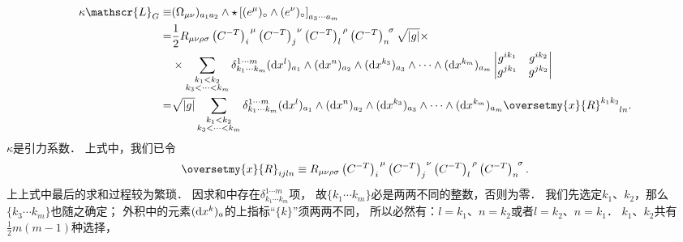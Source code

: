 \begin{align*}
	\kappa\mathscr{L}_{G} \equiv& (\Omega_{\mu\nu} )_{a_1 a_2}\wedge 
	\star \left[ (e^\mu)_{\circ} \wedge (e^\nu)_{\circ}\right]_{a_3 \cdots a_m} \\
	=& \frac{1}{2} R_{\mu\nu\rho\sigma}
	\left(C^{-T}\right)^{\hphantom{a}\mu}_{i} \left(C^{-T}\right)^{\hphantom{a}\nu}_{j} 
	\left(C^{-T}\right)^{\hphantom{a}\rho}_{l} \left(C^{-T}\right)^{\hphantom{a}\sigma}_{n} \sqrt{|g|} \times \\
	&\times \sum_{\substack {k_1<k_2 \\ k_{3}<\cdots<k_m}}
	\delta_{k_1 \cdots k_m}^{1 \cdots m}
	({\rm d}x^{l})_{a_1} \wedge ({\rm d}x^{n})_{a_2} \wedge 
	({\rm d}x^{k_{3}})_{a_{3}} \wedge \cdots \wedge ({\rm d}x^{k_m})_{a_m}
	\begin{vmatrix}
		g^{i k_1} & g^{i k_2}  \\
		g^{j k_1} & g^{j k_2}  \\
	\end{vmatrix} 	 \\
	=& \sqrt{|g|} 
	\sum_{\substack {k_1<k_2 \\ k_{3}<\cdots<k_m}}
	\delta_{k_1 \cdots k_m}^{1 \cdots m}
	({\rm d}x^{l})_{a_1} \wedge ({\rm d}x^{n})_{a_2} \wedge 
	({\rm d}x^{k_{3}})_{a_{3}} \wedge \cdots \wedge ({\rm d}x^{k_m})_{a_m}
	\oversetmy{x}{R}_{\hphantom{k_1 k_2}ln}^{k_1 k_2}  .
\end{align*}
$\kappa$是引力系数．
上式中，我们已令
\begin{equation}
	\oversetmy{x}{R}_{ijln}  \equiv R_{\mu\nu\rho\sigma}
	\left(C^{-T}\right)^{\hphantom{a}\mu}_{i} \left(C^{-T}\right)^{\hphantom{a}\nu}_{j} 
	\left(C^{-T}\right)^{\hphantom{a}\rho}_{l} \left(C^{-T}\right)^{\hphantom{a}\sigma}_{n}.
\end{equation}
上上式中最后的求和过程较为繁琐．
因求和中存在$\delta_{k_1 \cdots k_m}^{1 \cdots m}$项，
故$\{k_1 \cdots k_m\}$必是两两不同的整数，否则为零．
我们先选定$k_1$、$k_2$，那么$\{k_3 \cdots k_m\}$也随之确定；
外积中的元素$({\rm d}x^k)_a$的上指标“$\{k\}$”须两两不同，
所以必然有：$l=k_1$、$n=k_2$或者$l=k_2$、$n=k_1$．
$k_1$、$k_2$共有$\frac{1}{2}m(m-1)$种选择，
